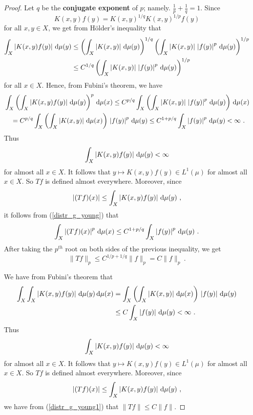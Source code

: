 \begin{proof}
  Let $q$ be the
{\bfseries conjugate exponent} of
$p$; namely. $\displaystyle \frac{1}{p} + \frac{1}{q} = 1$.  Since
\[
K(x,y)f(y) = K(x,y)^{1/q} K(x,y)^{1/p}f(y)
\]
for all $x,y \in X$, we get from Hölder's inequality that
\begin{align*}
\int_X \left| K(x,y)f(y)\right| \,\mathrm{d}{\mu(y)}
&\leq \left( \int_X \left| K(x,y)\right| \,\mathrm{d}{\mu(y)}\right)^{1/q}
\left(\int_X \left| K(x,y)\right|\,\left|f(y)\right|^p
\,\mathrm{d}{\mu(y)}\right)^{1/p} \\
& \leq C^{1/q} 
\left(\int_X \left| K(x,y)\right|\,\left|f(y)\right|^p
\,\mathrm{d}{\mu(y)}\right)^{1/p}
\end{align*}
for all $x \in X$.  Hence, from Fubini's theorem, we have
\begin{align}
&\int_X \left( \int_X \left| K(x,y)f(y)\right| \,\mathrm{d}{\mu(y)} \right)^p \,\mathrm{d}{\mu(x)}
\leq C^{p/q} \int_X \left(\int_X \left| K(x,y)\right|\,\left|f(y)\right|^p
\,\mathrm{d}{\mu(y)}\right) \,\mathrm{d}{\mu(x)} \nonumber \\
& \quad = C^{p/q} \int_X \left(\int_X \left| K(x,y)\right| \,\mathrm{d}{\mu(x)}\right)
\,\left|f(y)\right|^p \,\mathrm{d}{\mu(y)}
\leq C^{1+p/q} \int_X \left|f(y)\right|^p \,\mathrm{d}{\mu(y)} < \infty \  .
\label{distr_g_young}
\end{align}
Thus
\[
\int_X \left| K(x,y)f(y)\right| \,\mathrm{d}{\mu(y)} < \infty
\]
for almost all $x\in X$.  It follows that
$\displaystyle y \mapsto K(x,y)f(y) \in L^1(\mu)$ for almost all $x\in X$.
So $Tf$ is defined almost everywhere.  Moreover, since
\[
\left|(Tf)(x)\right| \leq \int_X \left| K(x,y)f(y)\right| \,\mathrm{d}{\mu(y)} \ ,
\]
it follows from (\ref{distr_g_young}) that
\[
\int_X \left|(Tf)(x)\right|^p \,\mathrm{d}{\mu(x)} \leq
C^{1+p/q} \int_X \left|f(y)\right|^p \,\mathrm{d}{\mu(y)} \ .
\]
After taking the $p^{th}$ root on both sides of the previous
inequality, we get
\[
\| Tf\|_p \leq C^{1/p+1/q} \| f\|_p = C \|f \|_p \ .
\]

  We have from Fubini's theorem that
\begin{align}
\int_X \int_X \left| K(x,y)f(y)\right| \,\mathrm{d}{\mu(y)} \,\mathrm{d}{\mu(x)}
& = \int_X \left(\int_X \left| K(x,y)\right| \,\mathrm{d}{\mu(x)}\right)
\,\left|f(y)\right| \,\mathrm{d}{\mu(y)} \nonumber \\
& \leq C \int_X \left|f(y)\right|\,\mathrm{d}{\mu(y)} < \infty \ .
\label{distr_g_young1}
\end{align}
Thus
\[
\int_X \left| K(x,y)f(y)\right| \,\mathrm{d}{\mu(y)} < \infty
\]
for almost all $x\in X$.
It follows that $\displaystyle y \mapsto K(x,y)f(y) \in L^1(\mu)$ for
almost all $x\in X$.  So $Tf$ is defined almost everywhere.  Moreover, since
\[
\left|(Tf)(x)\right| \leq \int_X \left| K(x,y)f(y)\right| \,\mathrm{d}{\mu(y)} \ ,
\]
we have from (\ref{distr_g_young1}) that
$\displaystyle \| Tf\| \leq  C \|f \|$.


\end{proof}
